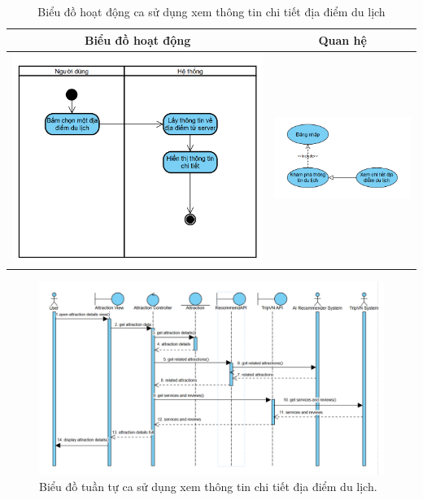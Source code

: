 \begin{table}[H] %
    \centering
    \caption{Biểu đồ hoạt động ca sử dụng xem thông tin chi tiết địa điểm du lịch} %
    \label{tab:uc_view_place_details_diagrams} %
    \begin{tabular}{| c | c |}
        \hline
        \textbf{Biểu đồ hoạt động} & \textbf{Quan hệ} \\
        \hline
        \includegraphics[width=0.5\linewidth]{figures/c3/3-3-8-ad.png} %
        &
        \includegraphics[width=0.45\linewidth]{figures/c3/3-3-8-rd.png} \\ %
        \hline
    \end{tabular}
\end{table}

\begin{figure}[H]
    \centering
    \includegraphics[width=1\textwidth]{figures/c3/3-3-8-sd.png} %
    \caption{Biểu đồ tuần tự ca sử dụng xem thông tin chi tiết địa điểm du lịch.}
    \label{fig:3-3-8-sequence-diagram}
\end{figure}